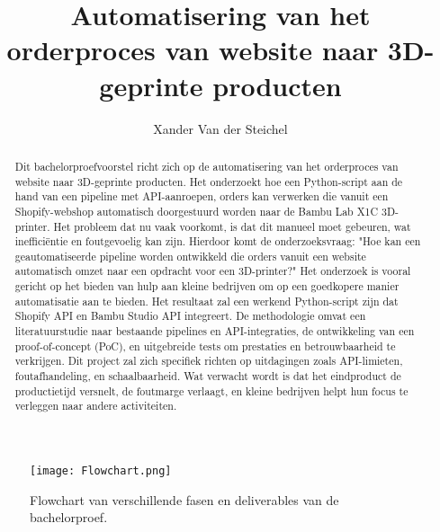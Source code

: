 \documentclass{hogent-article}
\title{Automatisering van het orderproces van website naar 3D-geprinte producten}
\author{Xander Van der Steichel}
\begin{document}
\begin{abstract}
    Dit bachelorproefvoorstel richt zich op de automatisering van het orderproces van website naar 3D-geprinte producten. Het onderzoekt hoe een Python-script aan de hand van een pipeline met API-aanroepen, orders kan verwerken die vanuit een Shopify-webshop automatisch doorgestuurd worden naar de Bambu Lab X1C 3D-printer. Het probleem dat nu vaak voorkomt, is dat dit manueel moet gebeuren, wat inefficiëntie en foutgevoelig kan zijn. Hierdoor komt de onderzoeksvraag: "Hoe kan een geautomatiseerde pipeline worden ontwikkeld die orders vanuit een website automatisch omzet naar een opdracht voor een 3D-printer?" Het onderzoek is vooral gericht op het bieden van hulp aan kleine bedrijven om op een goedkopere manier automatisatie aan te bieden. Het resultaat zal een werkend Python-script zijn dat Shopify API en Bambu Studio API integreert. De methodologie omvat een literatuurstudie naar bestaande pipelines en API-integraties, de ontwikkeling van een proof-of-concept (PoC), en uitgebreide tests om prestaties en betrouwbaarheid te verkrijgen. Dit project zal zich specifiek richten op uitdagingen zoals API-limieten, foutafhandeling, en schaalbaarheid. Wat verwacht wordt is dat het eindproduct de productietijd versnelt, de foutmarge verlaagt, en kleine bedrijven helpt hun focus te verleggen naar andere activiteiten.
 
\end{abstract}




\tableofcontents



\printbibliography[heading=bibintoc]


\begin{figure}[H]  %
    \centering
    \texttt{[image: Flowchart.png]}  %
    \caption{Flowchart van verschillende fasen en deliverables van de bachelorproef.}
    \label{fig:flowchart}  %
\end{figure}
\end{document}
